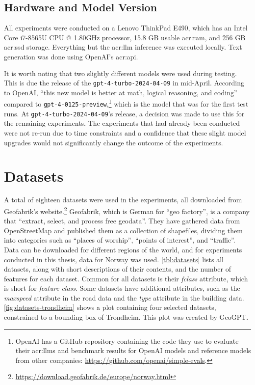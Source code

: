 \subsection{Hardware and Model Version}
\label{subsec:hardware-and-model-version}

All experiments were conducted on a Lenovo ThinkPad E490, which has an Intel{\textregistered} Core\texttrademark{} i7-8565U CPU @ 1.80GHz processor, 15.8 GB usable \acrshort{acr:ram}, and 256 GB \acrshort{acr:ssd} storage. Everything but the \acrshort{acr:llm} inference was executed locally. Text generation was done using OpenAI's \acrshort{acr:api}.

It is worth noting that two slightly different models were used during testing. This is due the release of the \texttt{gpt-4-turbo-2024-04-09} in mid-April. According to OpenAI, \enquote{this new model is better at math, logical reasoning, and coding} compared to \texttt{gpt-4-0125-preview},\footnote{OpenAI has a GitHub repository containing the code they use to evaluate their \glspl{acr:llm} and benchmark results for OpenAI models and reference models from other companies: \url{https://github.com/openai/simple-evals}.} which is the model that was for the first test runs. At \texttt{gpt-4-turbo-2024-04-09}'s release, a decision was made to use this for the remaining experiments. The experiments that had already been conducted were not re-run due to time constraints and a confidence that these slight model upgrades would not significantly change the outcome of the experiments.


\section{Datasets}
\label{sec:datasets}

A total of eighteen datasets were used in the experiments, all downloaded from Geofabrik's website.\footnote{\url{https://download.geofabrik.de/europe/norway.html}} Geofabrik, which is German for \enquote{geo factory}, is a company that \enquote{extract, select, and process free geodata}. They have gathered data from OpenStreetMap and published them as a collection of shapefiles, dividing them into categories such as \enquote{places of worship}, \enquote{points of interest}, and \enquote{traffic}. Data can be downloaded for different regions of the world, and for experiments conducted in this thesis, data for Norway was used. \autoref{tbl:datasets} lists all datasets, along with short descriptions of their contents, and the number of features for each dataset. Common for all datasets is their \emph{fclass} attribute, which is short for \emph{feature class}. Some datasets have additional attributes, such as the \emph{maxspeed} attribute in the road data and the \emph{type} attribute in the building data. \autoref{fig:datasets-trondheim} shows a plot containing four selected datasets, constrained to a bounding box of Trondheim. This plot was created by GeoGPT.

